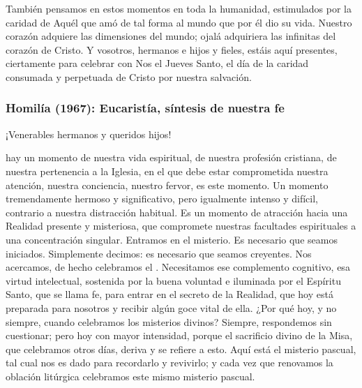 \begin{body}

También pensamos en estos momentos en toda la humanidad, estimulados por la caridad de Aquél que amó de tal forma al mundo que por él dio su vida. Nuestro corazón adquiere las dimensiones del mundo; ojalá adquiriera las infinitas del corazón de Cristo. Y vosotros, hermanos e hijos y fieles, estáis aquí presentes, ciertamente para celebrar con Nos el Jueves Santo, el día de la caridad consumada y perpetuada de Cristo por nuestra salvación.
\end{body}

\label{b-05-01-1964H}

\newpage

\subsubsection{Homilía (1967): Eucaristía, síntesis de nuestra fe}



\begin{body}
¡Venerables hermanos y queridos hijos!

 hay un momento de nuestra vida espiritual, de nuestra profesión cristiana, de nuestra pertenencia a la Iglesia, en el que debe estar comprometida nuestra atención, nuestra conciencia, nuestro fervor, es este momento. Un momento tremendamente hermoso y significativo, pero igualmente intenso y difícil, contrario a nuestra distracción habitual. Es un momento de atracción hacia una Realidad presente y misteriosa, que compromete nuestras facultades espirituales a una concentración singular. Entramos en el misterio. Es necesario que seamos iniciados. Simplemente decimos: es necesario que seamos creyentes. Nos acercamos, de hecho celebramos el . Necesitamos ese complemento cognitivo, esa virtud intelectual, sostenida por la buena voluntad e iluminada por el Espíritu Santo, que se llama fe, para entrar en el secreto de la Realidad, que hoy está preparada para nosotros y recibir algún goce vital de ella. ¿Por qué hoy, y no siempre, cuando celebramos los misterios divinos? Siempre, respondemos sin cuestionar; pero hoy con mayor intensidad, porque el sacrificio divino de la Misa, que celebramos otros días, deriva y se refiere a esto. Aquí está el misterio pascual, tal cual nos es dado para recordarlo y revivirlo; y cada vez que renovamos la oblación litúrgica celebramos este mismo misterio pascual.
\end{body}


